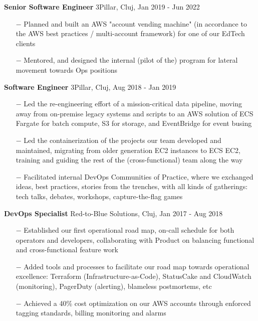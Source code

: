 \documentclass{article}
\begin{document}
\textbf{Senior Software Engineer} \hfill 3Pillar, Cluj, Jan 2019 - Jun 2022

\begin{itemize}
    \item[$-$] Planned and built an AWS "account vending machine" (in accordance to the AWS best practices / multi-account framework) for one of our EdTech clients
    \item[$-$] Mentored, and designed the internal (pilot of the) program for lateral movement towards Ops positions
\end{itemize}

\textbf{Software Engineer} \hfill 3Pillar, Cluj, Aug 2018 - Jan 2019

\begin{itemize}
    \item[$-$] Led the re-engineering effort of a mission-critical data pipeline, moving away from on-premise legacy systems and scripts to an AWS solution of ECS Fargate for batch compute, S3 for storage, and EventBridge for event busing
    \item[$-$] Led the containerization of the projects our team developed and maintained, migrating from older generation EC2 instances to ECS EC2, training and guiding the rest of the (cross-functional) team along the way
    \item[$-$] Facilitated internal DevOps Communities of Practice, where we exchanged ideas, best practices, stories from the trenches, with all kinds of gatherings: tech talks, debates, workshops, capture-the-flag games
\end{itemize}

\textbf{DevOps Specialist} \hfill Red-to-Blue Solutions, Cluj, Jan 2017 - Aug 2018
\begin{itemize}
    \item[$-$] Established our first operational road map, on-call schedule for both operators and developers, collaborating with Product on balancing functional and cross-functional feature work
    \item[$-$] Added tools and processes to facilitate our road map towards operational excellence: Terraform (Infrastructure-as-Code), StatusCake and CloudWatch (monitoring), PagerDuty (alerting), blameless postmortems, etc
    \item[$-$] Achieved a 40\% cost optimization on our AWS accounts through enforced tagging
standards, billing monitoring and alarms
\end{itemize}
\end{document}
